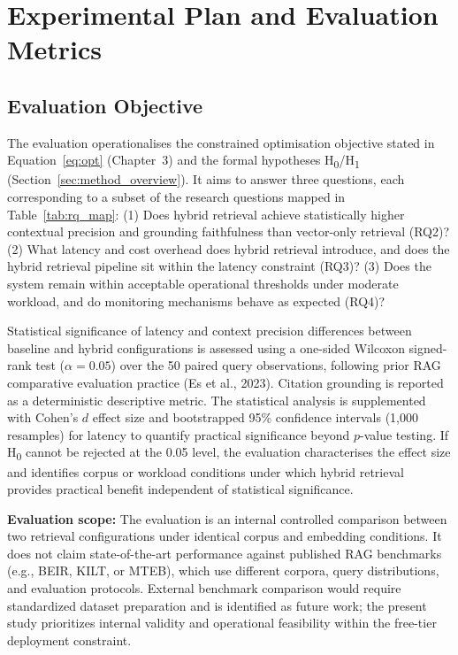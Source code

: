 \chapter{Experimental Plan and Evaluation Metrics}

\section{Evaluation Objective}
\label{sec:eval_objective}

The evaluation operationalises the constrained optimisation objective stated in Equation~\ref{eq:opt} (Chapter~3) and the formal hypotheses H\textsubscript{0}/H\textsubscript{1} (Section~\ref{sec:method_overview}). It aims to answer three questions, each corresponding to a subset of the research questions mapped in Table~\ref{tab:rq_map}: (1) Does hybrid retrieval achieve statistically higher contextual precision and grounding faithfulness than vector-only retrieval (RQ2)? (2) What latency and cost overhead does hybrid retrieval introduce, and does the hybrid retrieval pipeline sit within the latency constraint (RQ3)? (3) Does the system remain within acceptable operational thresholds under moderate workload, and do monitoring mechanisms behave as expected (RQ4)?

Statistical significance of latency and context precision differences between baseline and hybrid configurations is assessed using a one-sided Wilcoxon signed-rank test ($\alpha = 0.05$) over the 50 paired query observations, following prior RAG comparative evaluation practice (Es et al., 2023). Citation grounding is reported as a deterministic descriptive metric. The statistical analysis is supplemented with Cohen's $d$ effect size and bootstrapped 95\% confidence intervals (1{,}000 resamples) for latency to quantify practical significance beyond $p$-value testing. If H\textsubscript{0} cannot be rejected at the 0.05 level, the evaluation characterises the effect size and identifies corpus or workload conditions under which hybrid retrieval provides practical benefit independent of statistical significance.

\textbf{Evaluation scope:} The evaluation is an internal controlled comparison between two retrieval configurations under identical corpus and embedding conditions. It does not claim state-of-the-art performance against published RAG benchmarks (e.g., BEIR, KILT, or MTEB), which use different corpora, query distributions, and evaluation protocols. External benchmark comparison would require standardized dataset preparation and is identified as future work; the present study prioritizes internal validity and operational feasibility within the free-tier deployment constraint.

